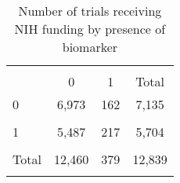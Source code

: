 \begin{table}[htbp]\centering
\def\sym#1{\ifmmode^{#1}\else\(^{#1}\)\fi}
\caption{Number of trials receiving NIH funding by presence of biomarker}
\begin{tabular}{l*{3}{c}}
\hline\hline
                &\multicolumn{3}{c}{}                                    \\
                &        0         &        1         &    Total         \\
\hline
0               &    6,973         &      162         &    7,135         \\
                &                  &                  &                  \\
[1em]
1               &    5,487         &      217         &    5,704         \\
                &                  &                  &                  \\
[1em]
Total           &   12,460         &      379         &   12,839         \\
                &                  &                  &                  \\
\hline\hline
\end{tabular}
\end{table}
